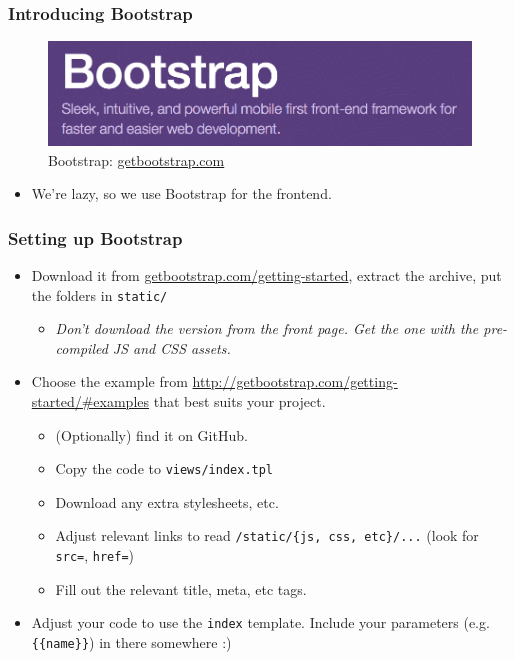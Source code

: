 \documentclass{beamer}
\begin{document}
\begin{frame}
  \frametitle{Introducing Bootstrap}
  \begin{figure}[h!]
    \centering
    \includegraphics[scale=0.3]{imgs/bootstrap_banner.png}
    \caption{Bootstrap: \url{getbootstrap.com}}
    \label{fig:bootstrap_banner}
  \end{figure}

  \begin{itemize}
  \item We're lazy, so we use Bootstrap for the frontend.
\end{itemize}
\end{frame}

\begin{frame}[fragile]
\frametitle{Setting up Bootstrap}
\begin{itemize}
\item Download it from \url{getbootstrap.com/getting-started}, extract
  the archive, put the folders in \texttt{static/}
  \begin{itemize}
  \item \emph{Don't download the version from the front page. Get the
      one with the pre-compiled JS and CSS assets.}
  \end{itemize}
  \item Choose the example from
    \url{http://getbootstrap.com/getting-started/#examples} that best
    suits your project.
    \begin{itemize}
      \item (Optionally) find it on GitHub.
      \item Copy the code to \texttt{views/index.tpl}
      \item Download any extra stylesheets, etc.
      \item Adjust relevant links to read \texttt{/static/\{js, css,
          etc\}/...} (look for \texttt{src=}, \texttt{href=})
      \item Fill out the relevant title, meta, etc tags.
    \end{itemize}
  \item Adjust your code to use the \texttt{index} template. Include
    your parameters (e.g. \texttt{\{\{name\}\}}) in there somewhere :)
  \end{itemize}
\end{frame}
\end{document}
